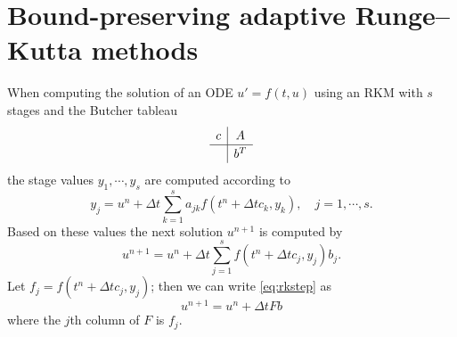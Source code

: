 \documentclass[a4paper]{article}
\numberwithin{equation}{section}
\theoremstyle{plain}
\theoremstyle{definition}
\numberwithin{theorem}{section}
\newcommand{\dt}{{\Delta t}}
\newcommand{\1}{\mathbbm{1}}
\begin{document}


\section{Bound-preserving adaptive Runge--Kutta methods}\label{sec:main_idea}

When computing the solution of an ODE $u ' = f(t,u) $ using an RKM with $s$ stages and the Butcher tableau
\begin{align}
\renewcommand{\arraystretch}{1.2}
\begin{array}{c|c}
c &  A \\
\hline
 & b^T\\
\end{array}
\end{align}
the stage values $y_1,\cdots,y_s$ are computed according to
\begin{equation}
y_j =  u^n + \dt \sum_{k = 1}^{s} a_{jk} f(t^n + \dt c_k,y_k),  \quad j = 1,\cdots,s.
\end{equation}
Based on these values the next solution $u^{n+1}$ is computed by
\begin{equation} \label{eq:rkstep}
u^{n+1} = u^n + \dt \sum_{j  = 1}^s f(t^n + \dt c_j,y_j) b_j .
\end{equation}
Let $f_j = f(t^n + \dt c_j,y_j)$; then we can write \eqref{eq:rkstep} as
\begin{equation}\label{eq:Combination}
u^{n+1} = u^n + \dt F b
\end{equation}
where the $j$th column of $F$ is $f_j$.
\end{document}
